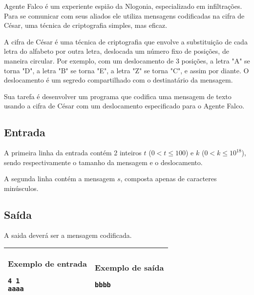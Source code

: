 Agente Falco é um experiente espião da Nlogonia, especializado em infiltrações. Para se comunicar com seus aliados ele utiliza mensagens codificadas na cifra de César, uma técnica de criptografia simples, mas eficaz.

A cifra de César é uma técnica de criptografia que envolve a substituição de cada letra do alfabeto por outra letra, deslocada um número fixo de posições, de maneira circular. Por exemplo, com um deslocamento de 3 posições, a letra "A" se torna "D", a letra "B" se torna "E", a letra "Z" se torna "C", e assim por diante. O deslocamento é um segredo compartilhado com o destinatário da mensagem.

Sua tarefa é desenvolver um programa que codifica uma mensagem de texto usando a cifra de César com um deslocamento especificado para o Agente Falco.
\subsection*{Entrada}
 
A primeira linha da entrada  contém 2 inteiros $t$ ($0 < t \leq 100$) e $k$ ($0 < k \leq 10^{18}$), sendo respectivamente o tamanho da mensagem e o deslocamento.
 
A segunda linha contém a mensagem $s$, composta apenas de caracteres minúsculos.
 
\subsection*{Saída}
A saida deverá ser a mensagem codificada.

\begin{table}[!h]
\centering
\begin{tabular}{|l|l|}
\hline
\begin{minipage}[t]{3in}
\textbf{Exemplo de entrada}
\begin{verbatim}
4 1
aaaa
\end{verbatim}
\vspace{1mm}
\end{minipage}
&
\begin{minipage}[t]{3in}
\textbf{Exemplo de saída}
\begin{verbatim}
bbbb
\end{verbatim}
\vspace{1mm}
\end{minipage} \\
\hline
\end{tabular}
\end{table}

